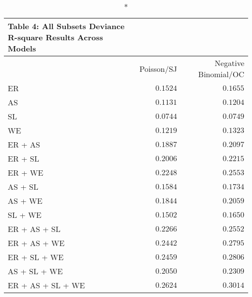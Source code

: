 \begin{longtable}{l|rr}
\caption*{
{\large Table 4: All Subsets Deviance R-square Results Across Models}
} \\ 
\toprule
\multicolumn{1}{l}{} & Poisson/SJ & Negative Binomial/OC \\ 
\midrule
ER & $0.1524$ & $0.1655$ \\ 
AS & $0.1131$ & $0.1204$ \\ 
SL & $0.0744$ & $0.0749$ \\ 
WE & $0.1219$ & $0.1323$ \\ 
ER + AS & $0.1887$ & $0.2097$ \\ 
ER + SL & $0.2006$ & $0.2215$ \\ 
ER + WE & $0.2248$ & $0.2553$ \\ 
AS + SL & $0.1584$ & $0.1734$ \\ 
AS + WE & $0.1844$ & $0.2059$ \\ 
SL + WE & $0.1502$ & $0.1650$ \\ 
ER + AS + SL & $0.2266$ & $0.2552$ \\ 
ER + AS + WE & $0.2442$ & $0.2795$ \\ 
ER + SL + WE & $0.2459$ & $0.2806$ \\ 
AS + SL + WE & $0.2050$ & $0.2309$ \\ 
ER + AS + SL + WE & $0.2624$ & $0.3014$ \\ 
\bottomrule
\end{longtable}

